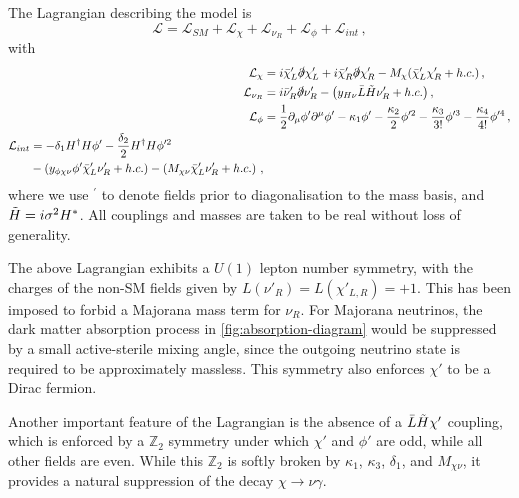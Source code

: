 \documentclass[aps, prd, reprint, nofootinbib, amsmath, amssymb, floatfix]{revtex4-2}
\begin{document}
The Lagrangian describing the model is
%
\begin{equation}\label{eq:FullLagrangian}
    \mathcal{L} = \mathcal{L}_{SM} + \mathcal{L}_{\chi} + \mathcal{L}_{\nu_R} + \mathcal{L}_{\phi} + \mathcal{L}_{int} \,,
\end{equation}
%
with
%
\begin{align}
    \mathcal{L}_\chi & = i\bar{\chi}'_L\slashed{\partial}\chi'_L + i\bar{\chi}'_R\slashed{\partial}\chi'_R - M_\chi (\bar{\chi}'_L\chi'_R + h.c.) \,, \\
    \mathcal{L}_{\nu_R} & = i\bar{\nu}'_R\slashed{\partial}\nu'_R - \big(y_{H\nu}\bar{L}\Tilde{H}\nu'_R + h.c.\big) \,, \\
    \mathcal{L}_{\phi} & = \frac{1}{2}\partial_\mu \phi' \partial^\mu \phi' - \kappa_{1} \phi' - \frac{\kappa_2}{2}\phi'^2 - \frac{\kappa_3}{3!}\phi'^3 - \frac{\kappa_4}{4!}\phi'^4 \,, \\
    \begin{split}
    \mathcal{L}_{int} & = - \delta_1 H^\dag H \phi' - \frac{\delta_2}{2}H^\dag H \phi'^2 \\
    & - \left(y_{\phi\chi\nu} \phi'\bar{\chi}'_L \nu'_R + h.c.\right)
    - \left(M_{\chi\nu}\bar{\chi}'_L \nu'_R + h.c.\right) \,,
    \end{split}\label{eq:IntLagrangian}
\end{align}
%
where we use $^\prime$ to denote fields prior to diagonalisation to the mass basis, and $\Tilde{H} = i\sigma^2 H^*$. All couplings and masses are taken to be real without loss of generality.

The above Lagrangian exhibits a $U(1)$ lepton number symmetry, with the charges of the non-SM fields given by $L(\nu'_R) = L(\chi'_{L,R}) = + 1$. This has been imposed to forbid a Majorana mass term for $\nu_R$. For Majorana neutrinos, the dark matter absorption process in \cref{fig:absorption-diagram} would be suppressed by a small active-sterile mixing angle, since the outgoing neutrino state is required to be approximately massless. This symmetry also enforces $\chi'$ to be a Dirac fermion.

Another important feature of the Lagrangian is the absence of a $\bar{L} \Tilde{H} \chi'$ coupling, which is enforced by a $\mathbb{Z}_2$ symmetry under which $\chi'$ and $\phi'$ are odd, while all other fields are even. While this $\mathbb{Z}_2$ is softly broken by $\kappa_1$, $\kappa_3$, $\delta_1$, and $M_{\chi\nu}$, it provides a natural suppression of the decay $\chi\to\nu\gamma$.
\end{document}

